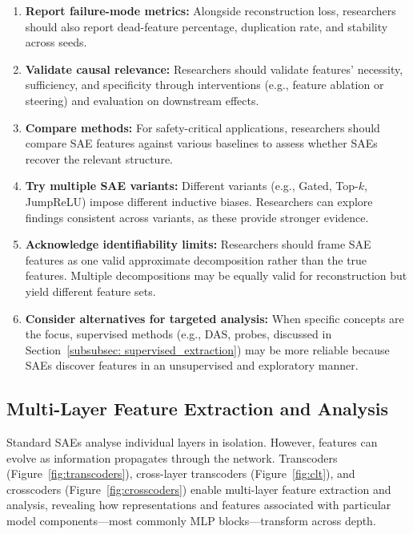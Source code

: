 \begin{enumerate}
    \item \textbf{Report failure-mode metrics:} Alongside reconstruction loss, researchers should also report dead-feature percentage, duplication rate, and stability across seeds.
    
    \item \textbf{Validate causal relevance:} Researchers should validate features’ necessity, sufficiency, and specificity through interventions (e.g., feature ablation or steering) and evaluation on downstream effects. 
    
    \item \textbf{Compare methods:} For safety-critical applications, researchers should compare SAE features against various baselines to assess whether SAEs recover the relevant structure.
    
    \item \textbf{Try multiple SAE variants:} Different variants (e.g., Gated, Top-$k$, JumpReLU) impose different inductive biases. Researchers can explore findings consistent across variants, as these provide stronger evidence.
    
    \item \textbf{Acknowledge identifiability limits:} Researchers should frame SAE features as one valid approximate decomposition rather than the true features. Multiple decompositions may be equally valid for reconstruction but yield different feature sets.
    
    \item \textbf{Consider alternatives for targeted analysis:} When specific concepts are the focus, supervised methods (e.g., DAS, probes, discussed in Section~\ref{subsubsec: supervised_extraction}) may be more reliable because SAEs discover features in an unsupervised and exploratory manner.
\end{enumerate}


\subsection{Multi-Layer Feature Extraction and Analysis}
\label{subsec:transcoders-crosscoders}

Standard SAEs analyse individual layers in isolation. However, features can evolve as information propagates through the network. Transcoders (Figure~\ref{fig:transcoders}), cross-layer transcoders (Figure~\ref{fig:clt}), and crosscoders (Figure~\ref{fig:crosscoders}) enable multi-layer feature extraction and analysis, revealing how representations and features associated with particular model components---most commonly MLP blocks---transform across depth.

